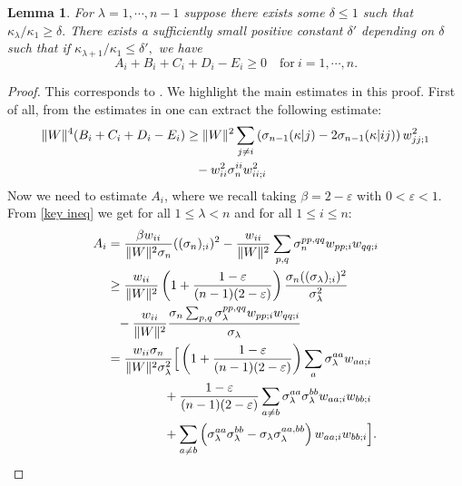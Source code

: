 \documentclass{amsart}
\newtheorem{lemma}[theorem]{Lemma}
\theoremstyle{definition}
\theoremstyle{remark}
\numberwithin{equation}{section}
\begin{document}
\begin{lemma}\label{app3}
For $\lambda=1,\cdots,n-1$ suppose there exists some $\delta\leq 1$ such that $\kappa_{\lambda}/\kappa_1\geq \delta.$ There exists a sufficiently small positive constant $\delta'$ depending on $\delta$ such that if $\kappa_{\lambda+1}/\kappa_1\leq \delta',$ we have
\[A_i+B_i+C_i+D_i-E_i\geq 0\quad \text{for}~i=1,\cdots,n.\]
\end{lemma}
\begin{proof}
This corresponds to \cite[Lemma~4.3]{Guan}. We highlight the main estimates in this proof. First of all, from the estimates in \cite[Lemma~4.2]{Guan} one can extract the following estimate:
\begin{align}\begin{split}\label{app3-1}
\|W\|^4(B_i+C_i+D_i-E_i)&\geq \|W\|^2\sum_{j\neq i} \left(\sigma_{n-1}(\kappa|j)-2\sigma_{n-1}(\kappa|ij)\right)w_{jj;1}^2\\
				&\hphantom{=}-w_{ii}^2\sigma_{n}^{ii}w_{ii;i}^2
\end{split}\end{align}
Now we need to estimate $A_i$, where we recall taking $\beta=2-\varepsilon$ with $0<\varepsilon<1$. From \eqref{key ineq} we get for all $1\leq \lambda<n$ and for all $1\leq i\leq n\colon$
\begin{align}\begin{split}
A_i&=\frac{\beta w_{ii}}{\|W\|^2\sigma_n}((\sigma_n)_{;i})^2-\frac{w_{ii}}{\|W\|^2}\sum_{p,q}\sigma_n^{pp,qq}w_{pp;i}w_{qq;i}\\
		&\geq \frac{w_{ii}}{\|W\|^2}\left(1+\frac{1-\varepsilon}{(n-1)(2-\varepsilon)}\right)\frac{\sigma_n((\sigma_{\lambda})_{;i})^2}{\sigma_{\lambda}^2}\\
					&\hphantom{=}-\frac{w_{ii}}{\|W\|^2}\frac{\sigma_n\sum_{p,q}\sigma_{\lambda}^{pp,qq}w_{pp;i}w_{qq;i}}{\sigma_{\lambda}}\\
                    &=\frac{w_{ii}\sigma_n}{\|W\|^2\sigma_{\lambda}^2}\Big[\left(1+\frac{1-\varepsilon}{(n-1)(2-\varepsilon)}\right)\sum_{a}\sigma_{\lambda}^{aa}w_{aa;i}\\
                    	&\hphantom{\frac{w_{ii}\sigma_n}{\|W\|^2\sigma_{\lambda}^2}\Big(}+\frac{1-\varepsilon}{(n-1)(2-\varepsilon)}\sum_{a\neq b}\sigma_\lambda^{aa}\sigma_{\lambda}^{bb}w_{aa;i}w_{bb;i}\\
                        &\hphantom{\frac{w_{ii}\sigma_n}{\|W\|^2\sigma_{\lambda}^2}\Big(}+\sum_{a\neq b}\left(\sigma_{\lambda}^{aa}\sigma_{\lambda}^{bb}-\sigma_{\lambda}\sigma_{\lambda}^{aa,bb}\right)w_{aa;i}w_{bb;i}\Big].
\end{split}\end{align}


\end{proof}
\end{document}
